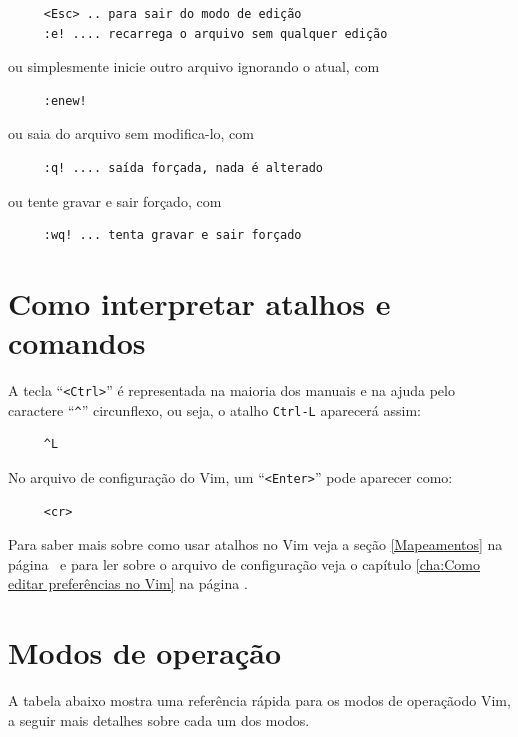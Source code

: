 \begin{verbatim}
     <Esc> .. para sair do modo de edição
     :e! .... recarrega o arquivo sem qualquer edição
\end{verbatim} %
ou simplesmente inicie outro arquivo ignorando o atual, com
\begin{verbatim}
     :enew!
\end{verbatim}
%
ou saia do arquivo sem modifica-lo, com
%
\begin{verbatim}
     :q! .... saída forçada, nada é alterado
\end{verbatim}
%
ou tente gravar e sair forçado, com
%
\begin{verbatim}
     :wq! ... tenta gravar e sair forçado
\end{verbatim}

\section{Como interpretar atalhos e comandos}\label{Como interpretar atalhos e comandos}
%
A tecla ``\verb|<Ctrl>|'' é representada na maioria dos manuais e na ajuda
pelo caractere ``\verb|^|'' circunflexo, ou seja, o atalho \verb|Ctrl-L| aparecerá assim:
\begin{verbatim}
     ^L
\end{verbatim} %

No arquivo de configuração do Vim, um ``\verb|<Enter>|'' pode aparecer como:
\begin{verbatim}
     <cr>
\end{verbatim}

Para saber mais sobre como usar atalhos no Vim
veja a seção \ref{Mapeamentos} na página~\pageref{Mapeamentos} e para ler sobre
o arquivo de configuração veja o capítulo \ref{cha:Como editar preferências no
Vim} na página \pageref{cha:Como editar preferências no Vim}.

\section{Modos de operação}\label{Modos de operação}

A tabela abaixo mostra uma referência rápida para os modos de operaçãodo Vim,
a seguir mais detalhes sobre cada um dos modos. \newline

